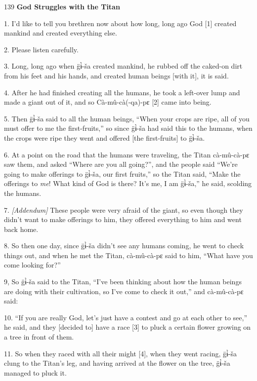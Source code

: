 
{\LARGE{}139 }{\LARGE{}\textbf{God Struggles with the Titan}}

{\LARGE{}1. I'd like to tell you brethren now about how long, long ago God [1]
created mankind and created everything else.}

{\LARGE{}2. Please listen carefully.}

{\LARGE{}3. Long, long ago when g̈ɨ̀-ša created mankind, he rubbed off the
caked-on dirt from his  feet and his hands, and created human beings [with it],
it is said.}

{\LARGE{}4. After he had finished creating all the humans, he took a left-over
lump and made a giant out of it, and so Cà-mû-cà(-qa)-pɛ [2] came into being.
}

{\LARGE{}5. Then g̈ɨ̀-ša said to all the human beings, ``When your crops are
ripe, all of you must offer to me the first-fruits,'' so since g̈ɨ̀-ša had
said this to the humans, when the crops were ripe they went and offered [the first-fruits]
to g̈ɨ̀-ša.}

{\LARGE{}6. At a point on the road that the humans were traveling, the Titan cà-mû-cà-pɛ
saw them, and asked ``Where are you all going?'', and the people said ``We're going
to make offerings to g̈ɨ̀-ša, our first fruits,'' so the Titan said, ``Make
the offerings to }{\LARGE{}\textit{me}}{\LARGE{}! What kind of God is there? It's
me, I am g̈ɨ̀-ša,'' he said, scolding the humans.}

{\LARGE{}7. }{\LARGE{}\textit{[Addendum]}}{\LARGE{} These people were very afraid
of the giant, so even though they didn't want to make offerings to him, they offered
everything to him and went back home.}

{\LARGE{}8. So then one day, since g̈ɨ̀-ša didn't see any humans coming, he
went to check things out, and when he met the Titan, cà-mû-cà-pɛ said to him,
``What have you come looking for?''}

{\LARGE{}9, So g̈ɨ̀-ša said to the Titan, ``I've been thinking about how the
human beings are doing with their cultivation, so I've come to check it out,''
and cà-mû-cà-pɛ said:}

{\LARGE{}10. ``If you are really God, let's just have a contest and go at each
other to see,'' he said, and they [decided to] have a race [3] to pluck a certain
flower growing on a tree in front of them.}

{\LARGE{}11. So when they raced with all their might [4], when they went racing,
g̈ɨ̀-ša clung to the Titan's leg, and having arrived at the flower on the tree,
g̈ɨ̀-ša managed to pluck it.}

